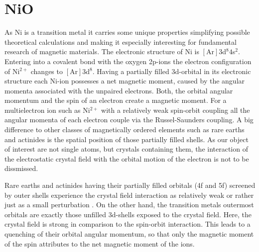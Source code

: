 \section{NiO}
As Ni is a transition metal it carries some unique properties simplifying possible theoretical calculations and making it especially interesting for fundamental research of magnetic materials.
The electronic structure of Ni is $[\text{Ar}]3$d$^8 4$s$^2$.
Entering into a covalent bond with the oxygen 2p-ions the electron configuration of Ni$^{2+}$ changes to $[\text{Ar}]3$d$^8$.
Having a partially filled 3d-orbital in its electronic structure each Ni-ion possesses a net magnetic moment, caused by the angular momenta associated with the unpaired electrons.
Both, the orbital angular momentum and the spin of an electron create a magnetic moment.
For a multielectron ion such as Ni$^{2+}$ with a relatively weak spin-orbit coupling all the angular momenta of each electron couple via the Russel-Saunders coupling.
A big difference to other classes of magnetically ordered elements such as rare earths and actinides is the spatial position of those partially filled shells.
As our object of interest are not single atoms, but crystals containing them, the interaction of the electrostatic crystal field with the orbital motion of the electron is not to be dissmissed.

Rare earths and actinides having their partially filled orbitals (4f and 5f) screened by outer shells experience the crystal field interaction as relatively weak or rather just as a small perturbation .
On the other hand, the transition metals outermost orbitals are exactly those unfilled 3d-shells exposed to the crystal field.
Here, the crystal field is strong in comparison to the spin-orbit interaction.
This leads to a quenching of their orbital angular momentum, so that only the magnetic moment of the spin attributes to the net magnetic moment of the ions.

